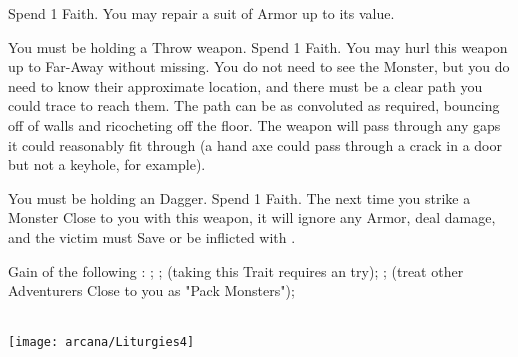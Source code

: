 \begin{multicols*}{2}
\LITURGY [
  Name = Indomitable Mail,
  Link = arcana-mystery-instantaneous-repair,
  Paradigm = Civilized,
  Duration=1 Maneuver Action
]

Spend 1 Faith. You may repair a suit of Armor up to its \MAX value.

\cbreak


\newpage

\LITURGY [
  Name = Lucky Throw,
  Link = arcana-mystery-lucky-throw,
  Paradigm = Ruinous,
  Duration=1 Maneuver Action
]

 You must be holding a Throw weapon. Spend 1 Faith.  You may hurl this weapon up to Far-Away without missing. You do not need to see the Monster, but you do need to know their approximate location, and there must be a clear path you could trace to reach them. The path can be as convoluted as required, bouncing off of walls and ricocheting off the floor. The weapon will pass through any gaps it could reasonably fit through (a hand axe could pass through a crack in a door but not a keyhole, for example).


\LITURGY [
  Name = Misericorde,
  Link = arcana-mystery-misericorde,
  Paradigm = Cthonic,
  Duration=1 Maneuver Action
]

You must be holding an  Dagger. Spend 1 Faith.  The next time you strike a Monster Close to you with this weapon, it will ignore any Armor, deal \MAX damage, and the victim must Save or be inflicted with .

\LITURGY [
  Name = Monstrous Aspect,
  Link = arcana-mystery-monstrous-aspect,
  Paradigm = Monstrous,
  Duration=\DICE Maneuvers
]

Gain \DICE of the following : ; ;
 (taking this Trait requires an \INSANITY try); ;
 (treat other Adventurers Close to you as "Pack Monsters");  
\\~ 


\begin{center}
\texttt{[image: arcana/Liturgies4]}
\end{center}


\LITURGY [
  Name = Mountainhands,
  Link = arcana-mystery-mountainhands,
  Paradigm = Empyrean,
  Duration=2 Maneuver Actions
]


\end{multicols*}
